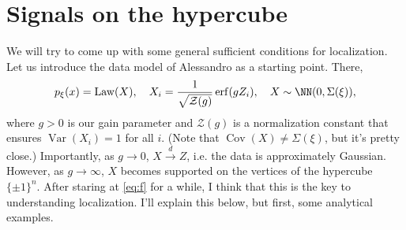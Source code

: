 \documentclass{article}
\begin{document}







\newpage
\section{Signals on the hypercube}
We will try to come up with some general sufficient conditions for localization.
Let us introduce the data model of Alessandro as a starting point.
There,
\begin{align}
  p_{\xi}(x) = \operatorname{Law}(X), \quad X_i = \frac{1}{\sqrt{\mathcal{Z}(g)}} \operatorname{erf}(g Z_i), \quad X \sim \NN(0, \Sigma(\xi)),
\end{align}
where $g > 0$ is our gain parameter and $\mathcal{Z}(g)$ is a normalization constant that ensures $\operatorname{Var}(X_i) = 1$ for all $i$.
(Note that $\operatorname{Cov}(X) \neq \Sigma(\xi)$, but it's pretty close.)
Importantly, as $g \to 0$, $X \overset{d}{\to} Z$, i.e. the data is approximately Gaussian.
However, as $g \to \infty$, $X$ becomes supported on the vertices of the hypercube $\{ \pm 1 \}^n$.
After staring at \cref{eq:f} for a while, I think that this is the key to understanding localization.
I'll explain this below, but first, some analytical examples.
\end{document}
